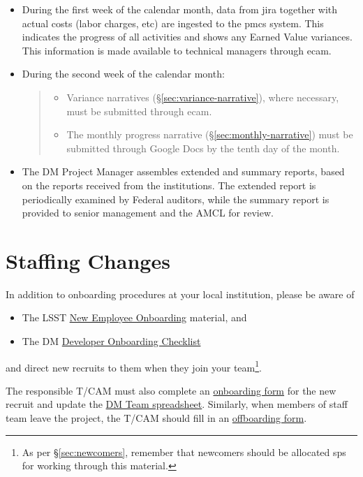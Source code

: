 \begin{itemize}
\item
  During the first week of the calendar month, data from \gls{jira} together with actual costs (labor charges, etc) are ingested to the \gls{pmcs} system.
  This indicates the progress of all activities and shows any Earned Value variances.
  This information is made available to technical managers through \gls{ecam}.
\item
  During the second week of the calendar month:

  \begin{quote}
  \begin{itemize}
  \item
    Variance narratives (\S\ref{sec:variance-narrative}), where necessary, must be submitted through \gls{ecam}.
  \item
    The monthly progress narrative (\S\ref{sec:monthly-narrative}) must be submitted through Google Docs by the tenth day of the month.
  \end{itemize}
  \end{quote}
\item
  The DM Project Manager assembles extended and summary reports, based
  on the reports received from the institutions. The extended report is
  periodically examined by Federal auditors, while the summary report is
  provided to senior management and the AMCL for review.
\end{itemize}

\section{Staffing Changes}
\label{sec:staffing}

In addition to onboarding procedures at your local institution, please
be aware of

\begin{itemize}
\item
  The LSST \href{https://project.lsst.org/onboarding}{New Employee
  Onboarding} material, and
\item
  The DM
  \href{https://developer.lsst.io/getting-started/onboarding.html}{Developer
  Onboarding Checklist}
\end{itemize}

and direct new recruits to them when they join your team\footnote{As per \S\ref{sec:newcomers}, remember that newcomers should be allocated \glspl{sp} for working through this material.}.

The responsible T/CAM must also complete an \href{https://project.lsst.org/onboarding/form}{onboarding form} for the new recruit and update the \href{https://docs.google.com/spreadsheets/d/1G9KXBJJHfWkVDQeApfXaN_nZjD_YUJlHiEDOzhTy-0c/edit?usp=drive_web}{DM Team spreadsheet}.
Similarly, when members of staff team leave the project, the T/CAM should fill in an \href{https://project.lsst.org/onboarding/offboarding_form}{offboarding form}.
